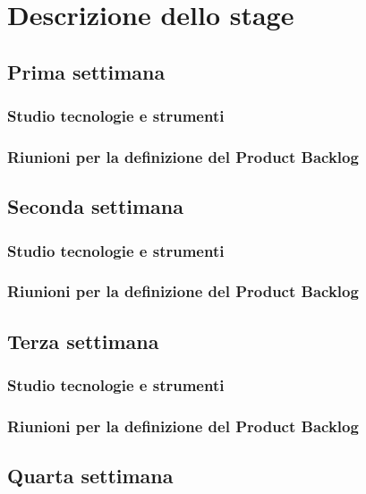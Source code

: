 
\chapter{Descrizione dello stage}
\label{cap:descrizione-stage}

\section{Prima settimana}
\subsection{Studio tecnologie e strumenti}
\subsection{Riunioni per la definizione del Product Backlog}

\section{Seconda settimana}
\subsection{Studio tecnologie e strumenti}
\subsection{Riunioni per la definizione del Product Backlog}

\section{Terza settimana}
\subsection{Studio tecnologie e strumenti}
\subsection{Riunioni per la definizione del Product Backlog}

\section{Quarta settimana}
